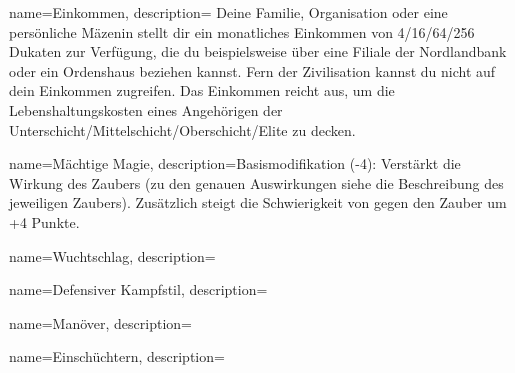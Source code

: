 {
    name={Einkommen},
    description={
Deine Familie, Organisation oder eine persönliche Mäzenin stellt dir ein monatliches Einkommen von 4/16/64/256 Dukaten zur Verfügung, die du beispielsweise über eine Filiale der Nordlandbank oder ein Ordenshaus beziehen kannst. Fern der Zivilisation kannst du nicht auf dein Einkommen zugreifen. Das Einkommen reicht aus, um die Lebenshaltungskosten eines Angehörigen der Unterschicht/Mittelschicht/Oberschicht/Elite zu decken.}}

{
    name={Mächtige Magie},
    description={Basismodifikation (-4): Verstärkt die Wirkung des Zaubers (zu den genauen Auswirkungen siehe die Beschreibung des jeweiligen Zaubers). Zusätzlich steigt die Schwierigkeit von  gegen den Zauber um +4 Punkte.}}
    
    

{
    name={Wuchtschlag},
    description={}}

{
    name={Defensiver Kampfstil},
    description={}}

{
    name={Manöver},
    description={}}

{
    name={Einschüchtern},
    description={}}
        
        
        
    
        
        
        
        
    

